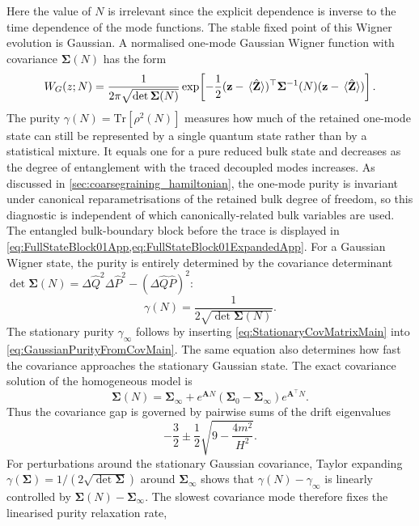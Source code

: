 \documentclass{article}
\def\Tr{\mathrm{Tr}}
\numberwithin{equation}{section}
\begin{document}
	Here the value of $N$ is irrelevant since the explicit dependence is inverse to the time dependence of the mode functions. The stable fixed point of this Wigner evolution is Gaussian. A normalised one-mode Gaussian Wigner function with covariance \(\mathbf{\Sigma}(N)\) has the form
	\begin{equation}
		W_G(z;N) = \frac{1}{2\pi\sqrt{\det\mathbf{\Sigma}(N)}} \exp\!\left[ -\frac12(\mathbf{z}-\ev*{\hat{\mathbf{Z}}})^\top\mathbf{\mathbf{\Sigma}}^{-1}(N)(\mathbf{z}-\ev*{\hat{\mathbf{Z}}}) \right].
	\end{equation}
	The purity \(\gamma(N)=\Tr[\rho^2(N)]\) measures how much of the retained one-mode state can still be represented by a single quantum state rather than by a statistical mixture. It equals one for a pure reduced bulk state and decreases as the degree of entanglement with the traced decoupled modes increases. As discussed in \cref{sec:coarsegraining_hamiltonian}, the one-mode purity is invariant under canonical reparametrisations of the retained bulk degree of freedom, so this diagnostic is independent of which canonically-related bulk variables are used. The entangled bulk-boundary block before the trace is displayed in \cref{eq:FullStateBlock01App,eq:FullStateBlock01ExpandedApp}. For a Gaussian Wigner state, the purity is entirely determined by the covariance determinant \(\det\mathbf{\Sigma}(N) = \Delta \hat{Q}^2 \Delta \hat{P}^2 - (\Delta \hat{Q}\hat{P})^2\):
	\begin{equation}
		\gamma(N) = \frac{1}{2\sqrt{\det\mathbf{\Sigma}(N)}} .
		\label{eq:GaussianPurityFromCovMain}
	\end{equation}
	The stationary purity \(\gamma_\infty\) follows by inserting \cref{eq:StationaryCovMatrixMain} into \cref{eq:GaussianPurityFromCovMain}. The same equation also determines how fast the covariance approaches the stationary Gaussian state. The exact covariance solution of the homogeneous model is
	\begin{equation}
		\mathbf{\Sigma}(N)=\mathbf{\Sigma}_\infty+e^{\mathbf{A}N}\left(\mathbf{\Sigma}_0-\mathbf{\Sigma}_\infty\right)e^{\mathbf{A}^\top N}.
		\label{eq:CovRelaxationMain}
	\end{equation}
	Thus the covariance gap is governed by pairwise sums of the drift eigenvalues
	\begin{equation}
		-\frac32\pm\frac12\sqrt{9-\frac{4m^2}{H^2}} .
		\label{eq:CovGapExponentsMain}
	\end{equation}
	For perturbations around the stationary Gaussian covariance, Taylor expanding \(\gamma(\mathbf{\Sigma})=1/(2\sqrt{\det \mathbf{\Sigma}})\) around \(\mathbf{\Sigma}_\infty\) shows that \(\gamma(N)-\gamma_\infty\) is linearly controlled by \(\mathbf{\Sigma}(N)-\mathbf{\Sigma}_\infty\). The slowest covariance mode therefore fixes the linearised purity relaxation rate,
\end{document}
